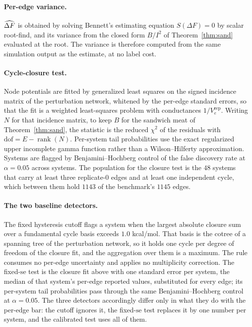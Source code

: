 \paragraph{Per-edge variance.} $\widehat{\Delta F}$ is obtained by solving Bennett's estimating equation
$S(\Delta F)=0$ by scalar root-find, and its variance from the closed form $B/I^2$ of
Theorem~\ref{thm:sand} evaluated at the root. The variance is therefore computed from the same
simulation output as the estimate, at no label cost.

\paragraph{Cycle-closure test.} Node potentials are fitted by generalized least squares on the
signed incidence matrix of the perturbation network, whitened by the per-edge standard errors, so
that the fit is a weighted least-squares problem with conductances $1/V_e^{\mathrm{rep}}$. Writing $N$ for that incidence matrix, to keep $B$ for the sandwich meat of
Theorem~\ref{thm:sand}, the statistic is the reduced $\chi^2$ of the residuals with
$\mathrm{dof}=E-\operatorname{rank}(N)$. Per-system tail probabilities use the exact regularized
upper incomplete gamma function rather than a Wilson--Hilferty approximation. Systems are flagged
by Benjamini--Hochberg control of the false discovery rate at $\alpha=0.05$ across systems. The population for the closure test is the
$48$ systems that carry at least three replicate-$0$ edges and at least one independent cycle,
which between them hold $1143$ of the benchmark's $1145$ edges.

\paragraph{The two baseline detectors.} The fixed hysteresis cutoff flags a system when the largest
absolute closure sum over a fundamental cycle basis exceeds $1.0$ kcal/mol. That basis is the
cotree of a spanning tree of the perturbation network, so it holds one cycle per degree of freedom
of the closure fit, and the aggregation over them is a maximum. The rule consumes no per-edge
uncertainty and applies no multiplicity correction. The fixed-$\mathrm{se}$ test is the closure fit
above with one standard error per system, the median of that system's per-edge reported values,
substituted for every edge; its per-system tail probabilities pass through the same
Benjamini--Hochberg control at $\alpha=0.05$. The three detectors accordingly differ only in what
they do with the per-edge bar: the cutoff ignores it, the fixed-$\mathrm{se}$ test replaces it by
one number per system, and the calibrated test uses all of them.

